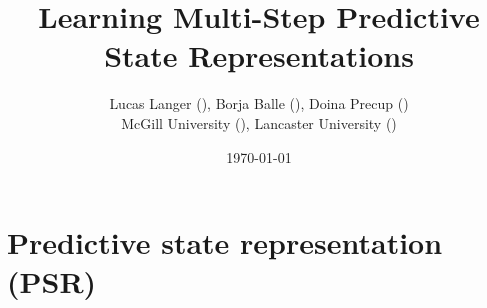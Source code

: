 \documentclass{beamer}
\title[Multi-Step PSRs]{Learning Multi-Step Predictive State Representations} %
\author{Lucas Langer (\ding{168}), Borja Balle (\ding{70}), Doina Precup (\ding{168}) \\ McGill University (\ding{168}), Lancaster University (\ding{70})} %
\institute[McGill University] %
{
\\
\medskip
}
\date{\today} %
\begin{document}
\begin{frame}
\titlepage %
\end{frame}

\begin{comment}
\begin{frame}
\frametitle{Overview} %
\tableofcontents %
\end{frame}
\end{comment}



\section{Predictive state representation (PSR)} %



\end{document}
